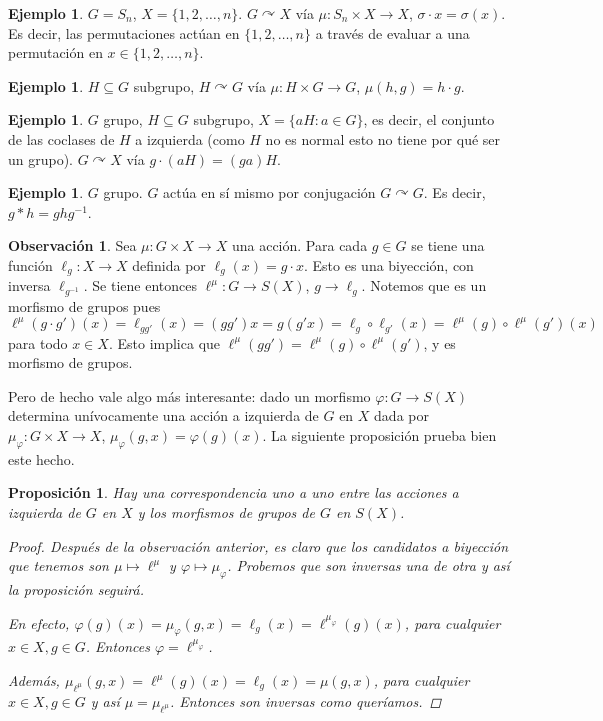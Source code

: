 \documentclass[12pt]{book}
\newtheorem{prop}[teo]{Proposición}
\theoremstyle{definition}
\newtheorem{obs}[teo]{Observación}
\newtheorem{ex}[teo]{Ejemplo}
\def\acts{\curvearrowright}
\begin{document}
\begin{ex}
$G=S_n$, $X=\{1,2,\ldots , n\}$. $G\acts X$ vía $\mu: S_n\times X\to X$, $\sigma\cdot x = \sigma(x)$. Es decir, las permutaciones actúan en $\{1,2,\ldots , n\}$ a través de evaluar a una permutación en $x\in \{1,2,\ldots , n\}$.
\end{ex}
\begin{ex}
$H\subseteq G$ subgrupo, $H\acts G$ vía $\mu :H\times G\to G$, $\mu(h,g) = h\cdot g$.
\end{ex}
\begin{ex}
$G$ grupo, $H\subseteq G$ subgrupo, $X=\{aH:a\in G\}$, es decir, el conjunto de las coclases de $H$ a izquierda (como $H$ no es normal esto no tiene por qué ser un grupo). $G\acts X$ vía $g\cdot (aH) = (ga)H$.
\end{ex}
\begin{ex}
$G$ grupo. $G$ actúa en sí mismo por conjugación $G\acts G$. Es decir, $g*h = ghg^{-1}$.
\end{ex}
\begin{obs}
Sea $\mu:G\times X\to X$ una acción. Para cada $g\in G$ se tiene una función $\ell_g:X\to X$ definida por $\ell_g(x)=g\cdot x$. Esto es una biyección, con inversa $\ell_{g^{-1}}$. Se tiene entonces $\ell^{\mu}:G\to S(X)$, $g\to \ell_g$. Notemos que es un morfismo de grupos pues $\ell^\mu (g\cdot g') (x) = \ell_{gg'}(x) = (gg')x = g(g'x) = \ell_g\circ \ell_{g'}(x) = \ell^\mu (g)\circ \ell^\mu (g')(x)$ para todo $x\in X$. Esto implica que $\ell^\mu (gg') = \ell^\mu (g)\circ \ell^\mu (g')$, y es morfismo de grupos.

Pero de hecho vale algo más interesante: dado un morfismo $\varphi:G\to S(X)$ determina unívocamente una acción a izquierda de $G$ en $X$ dada por $\mu_{\varphi}:G\times X\to X$, $\mu_{\varphi}(g,x) = \varphi(g)(x)$. La siguiente proposición prueba bien este hecho.
\end{obs}
\begin{prop}
Hay una correspondencia uno a uno entre las acciones a izquierda de $G$ en $X$ y los morfismos de grupos de $G$ en $S(X)$.
\begin{proof}
Después de la observación anterior, es claro que los candidatos a biyección que tenemos son $\mu \mapsto \ell^\mu$ y $\varphi\mapsto \mu_\varphi$. Probemos que son inversas una de otra y así la proposición seguirá.

En efecto, $\varphi(g)(x) = \mu_\varphi(g,x) = \ell_{g}(x) = \ell^{\mu_{\varphi}}(g)(x)$, para cualquier $x\in X, g\in G$. Entonces $\varphi = \ell^{\mu_\varphi}$.

Además, $\mu_{\ell^\mu}(g,x) = \ell^\mu (g)(x) = \ell_g (x) = \mu(g,x)$, para cualquier $x\in X, g\in G$ y así $\mu = \mu_{\ell^\mu}$. Entonces son inversas como queríamos.

\end{proof}
\end{prop}
\end{document}
